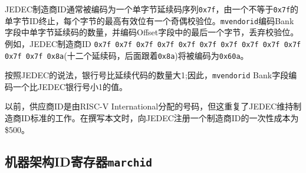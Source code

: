 \iffalse
JEDEC manufacturer IDs are ordinarily encoded as a sequence of one-byte
continuation codes {\tt 0x7f}, terminated by a one-byte ID not equal to
{\tt 0x7f}, with an odd parity bit in the most-significant bit of each byte.
{\tt mvendorid} encodes the number of one-byte continuation
codes in the Bank field, and encodes the final byte in the Offset field,
discarding the parity bit.  For example, the JEDEC manufacturer ID
{\tt 0x7f 0x7f 0x7f 0x7f 0x7f 0x7f 0x7f 0x7f 0x7f 0x7f 0x7f 0x7f 0x8a}
(twelve continuation codes followed by {\tt 0x8a}) would be encoded in the
{\tt mvendorid} CSR as {\tt 0x60a}.
\fi

JEDEC制造商ID通常被编码为一个单字节延续码序列{\tt 0x7f}，由一个不等于{\tt 0x7f}的单字节ID终止，每个字节的最高有效位有一个奇偶校验位。{\tt mvendorid}编码Bank字段中单字节延续码的数量，并编码Offset字段中的最后一个字节，丢弃校验位。例如，JEDEC制造商ID {\tt 0x7f 0x7f 0x7f 0x7f 0x7f 0x7f 0x7f 0x7f 0x7f 0x7f 0x7f 0x7f 0x8a}(十二个延续码，后面跟着{\tt 0x8a})将被编码为{\tt 0x60a}。

\iffalse
\begin{commentary}
In JEDEC's parlance, the bank number is one greater than the number of
continuation codes; hence, the {\tt mvendorid} Bank field encodes a value
that is one less than the JEDEC bank number.
\end{commentary}
\fi

\begin{commentary}
按照JEDEC的说法，银行号比延续代码的数量大1;因此，{\tt mvendorid} Bank字段编码一个比JEDEC银行号小1的值。
\end{commentary}

\iffalse
\begin{commentary}
Previously the vendor ID was to be a number allocated by RISC-V
International, but this duplicates the work of JEDEC in maintaining a
manufacturer ID standard.  At time of writing, registering a
manufacturer ID with JEDEC has a one-time cost of \$500.
\end{commentary}
\fi

\begin{commentary}
以前，供应商ID是由RISC-V International分配的号码，但这重复了JEDEC维持制造商ID标准的工作。在撰写本文时，向JEDEC注册一个制造商ID的一次性成本为\$500。
\end{commentary}

\subsection{机器架构ID寄存器{\tt marchid}}

